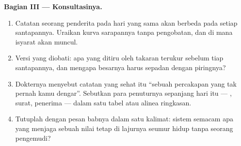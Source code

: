 \begin{problem}
\medskip\noindent\textbf{Bagian III --- Konsultasinya.}
\begin{enumerate}[resume]
  \item Catatan seorang penderita  pada hari yang
        sama akan berbeda pada setiap santapannya. Uraikan
        kurva sarapannya tanpa pengobatan, dan di mana
        isyarat  akan muncul.
  \item Versi yang diobati: apa yang ditiru oleh takaran
        terukur sebelum tiap santapannya, dan mengapa
        besarnya harus sepadan dengan piringnya?
  \item Dokternya menyebut catatan yang sehat itu ``sebuah
        percakapan yang tak pernah kamu dengar''. Sebutkan
        para penuturnya sepanjang hari itu --- ,
        surat, penerima --- dalam satu tabel atau alinea
        ringkasan.
  \item Tutuplah dengan pesan babnya dalam satu kalimat:
        sistem semacam apa yang menjaga sebuah nilai tetap
        di lajurnya seumur hidup tanpa seorang pengemudi?
\end{enumerate}
\end{problem}
